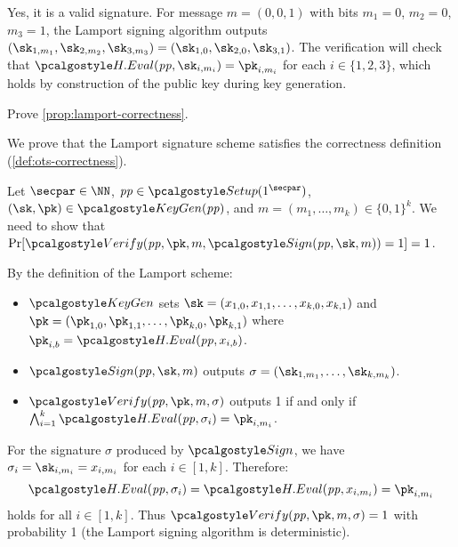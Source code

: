 \ifsolutions
\begin{mysolution}
  Yes, it is a valid signature.
  For message $m = (0, 0, 1)$ with bits $m_1 = 0$, $m_2 = 0$, $m_3 = 1$, the Lamport signing algorithm outputs $(\sk_{1,m_1}, \sk_{2,m_2}, \sk_{3,m_3}) = (\sk_{1,0}, \sk_{2,0}, \sk_{3,1})$.
  The verification will check that $\algo{H.Eval}(\params, \sk_{i,m_i}) = \pk_{i,m_i}$ for each $i \in \{1,2,3\}$, which holds by construction of the public key during key generation.
\end{mysolution}
\fi

\begin{exercise}\label{ex:lamport-correctness}
  Prove \autoref{prop:lamport-correctness}.
\end{exercise}

\ifsolutions
\begin{mysolution}
  We prove that the Lamport signature scheme satisfies the correctness definition (\autoref{def:ots-correctness}).
  
  Let $\secpar \in \NN$, $\params \in \algo{Setup}(1^\secpar)$, $(\sk, \pk) \in \algo{KeyGen}(\params)$, and $m = (m_1, \ldots, m_k) \in \{0,1\}^k$.
  We need to show that $\Pr[\algo{Verify}(\params, \pk, m, \algo{Sign}(\params, \sk, m)) = 1] = 1$.
  
  By the definition of the Lamport scheme:
  \begin{itemize}
    \item $\algo{KeyGen}$ sets $\sk = (x_{1,0}, x_{1,1}, \ldots, x_{k,0}, x_{k,1})$ and $\pk = (\pk_{1,0}, \pk_{1,1}, \ldots, \pk_{k,0}, \pk_{k,1})$ where $\pk_{i,b} = \algo{H.Eval}(\params, x_{i,b})$.
    \item $\algo{Sign}(\params, \sk, m)$ outputs $\sigma = (\sk_{1,m_1}, \ldots, \sk_{k,m_k})$.
    \item $\algo{Verify}(\params, \pk, m, \sigma)$ outputs 1 if and only if $\bigwedge_{i=1}^k \algo{H.Eval}(\params, \sigma_i) = \pk_{i,m_i}$.
  \end{itemize}
  
  For the signature $\sigma$ produced by $\algo{Sign}$, we have $\sigma_i = \sk_{i,m_i} = x_{i,m_i}$ for each $i \in [1,k]$.
  Therefore:
  \[
    \algo{H.Eval}(\params, \sigma_i) = \algo{H.Eval}(\params, x_{i,m_i}) = \pk_{i,m_i}
  \]
  holds for all $i \in [1,k]$.
  Thus $\algo{Verify}(\params, \pk, m, \sigma) = 1$ with probability 1 (the Lamport signing algorithm is deterministic).
\end{mysolution}
\fi

